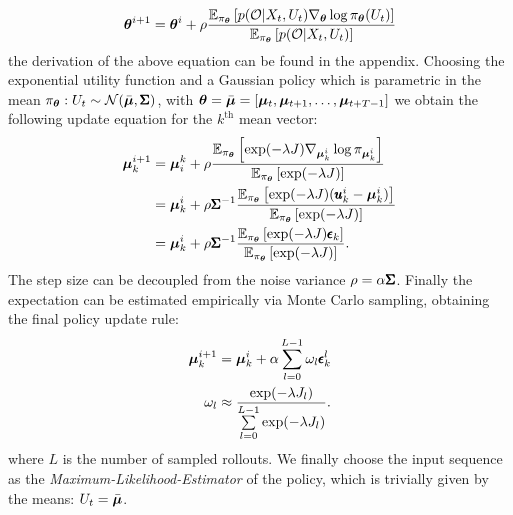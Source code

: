 \begin{equation}
    \boldsymbol{\theta}^{i+1} = \boldsymbol{\theta}^i + \rho \frac{\mathbb{E}_{\pi_{\boldsymbol{\theta}}} \left [p(\mathcal{O} | X_t, U_t) \nabla_{ \boldsymbol{\theta}} \log \pi_{\boldsymbol{\theta}} (U_t)\right]}{\mathbb{E}_{\pi_{\boldsymbol{\theta}}} \left [p(\mathcal{O} | X_t, U_t)\right]}
\end{equation}
the derivation of the above equation can be found in the appendix. 
Choosing the exponential utility function and a Gaussian policy which is parametric in the mean $\pi_{\boldsymbol{\theta}}: U_t \sim \mathcal{N}(\bar{\boldsymbol{\mu}}, \pmb{\Sigma})$, with $\boldsymbol{\theta} = \bar{\boldsymbol{\mu}} = [\boldsymbol{\mu}_t, \boldsymbol{\mu}_{t+1}, \dots, \boldsymbol{\mu}_{t+T-1}]$ we obtain the following update equation for the $k^{\text{th}}$ mean vector:
\begin{align}
    \boldsymbol{\mu}^{i+1}_{k} &=  \boldsymbol{\mu}^{k}_{i} + \rho \frac{\mathbb{E}_{\pi_{\boldsymbol{\theta}}} \left [ \exp( -\lambda J) \nabla_{\boldsymbol{\mu}_{k}^{i}} \log \pi_{\boldsymbol{\mu}^{i}_{k}}\right]}{\mathbb{E}_{\pi_{\boldsymbol{\theta}}} \left [\exp( -\lambda J)\right]} \\
    &= \boldsymbol{\mu}^{i}_{k} +  \rho \pmb{\Sigma}^{-1}\frac{\mathbb{E}_{\pi_{\boldsymbol{\theta}}} \left [\exp( -\lambda J) (\pmb{u}_{k}^{i} - \boldsymbol{\mu}^{i}_{k} )\right]}{\mathbb{E}_{\pi_{\boldsymbol{\theta}}} \left [\exp( -\lambda J)\right]}  \label{eq:bayes_to_mppi} \\
    &= \boldsymbol{\mu}^{i}_{k} +  \rho \pmb{\Sigma}^{-1} \frac{\mathbb{E}_{\pi_{\boldsymbol{\theta}}} \left [\exp( -\lambda J) \pmb{\epsilon}_k \right]}{\mathbb{E}_{\pi_{\boldsymbol{\theta}}} \left [\exp( -\lambda J)\right]}  \label{eq:alpha_assumption}.
\end{align}
The step size can be decoupled from the noise variance $\rho = \alpha \pmb{\Sigma} $. Finally the expectation can be estimated empirically via Monte Carlo sampling, obtaining the final policy update rule:
\begin{align} \label{eq:update_rule}
  \boldsymbol{\mu}^{i+1}_{k} &= \boldsymbol{\mu}^{i}_{k} + \alpha  \sum \limits_{l=0}^{L-1}  \omega_l \pmb{\epsilon}_{k}^{l} \\
  \omega_l  &\approx \frac{\exp ( -\lambda J_l )}{\sum \limits_{l=0}^{L-1} \exp ( -\lambda J_l)}. \label{eq:weighting}
\end{align}
where $L$ is the number of sampled rollouts. 
We finally choose the input sequence as the \emph{Maximum-Likelihood-Estimator} of the policy, which is trivially given by the means: $U_t = \bar{\boldsymbol{\mu}}$.

